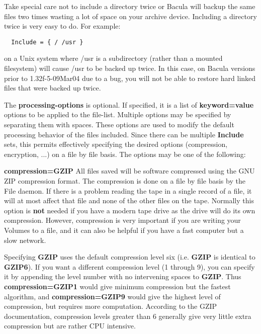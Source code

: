 \begin{description}
Take special care not to include a directory twice or Bacula will backup the
same files two times wasting a lot of space on your archive device. Including
a directory twice is very easy to do. For example: 

\footnotesize
\begin{verbatim}
  Include = { / /usr }
\end{verbatim}
\normalsize

on a Unix system where /usr is a subdirectory (rather than a mounted
filesystem) will cause /usr to be backed up twice. In this case, on Bacula
versions prior to 1.32f-5-09Mar04 due to a bug, you will not be able to
restore hard linked files that were backed up twice. 

The {\bf \lt{}processing-options\gt{}} is optional. If specified, it is a list
of {\bf keyword=value} options to be applied to the file-list. Multiple
options may be specified by separating them with spaces. These options are
used to modify the default processing behavior of the files included. Since
there can be multiple {\bf Include} sets, this permits effectively specifying
the desired options (compression, encryption, ...) on a file by file basis.
The options may be one of the following: 

\begin{description}

\item {\bf compression=GZIP}
All files saved will be software  compressed using the GNU ZIP compression
format. The  compression is done on a file by file basis by the File daemon. 
If there is a problem reading the tape in a  single record of a file, it will
at most affect that file and none  of the other files on the tape. Normally
this option is {\bf not} needed  if you have a modern tape drive as the drive
will do its own  compression. However, compression is very important if you
are writing  your Volumes to a file, and it can also be helpful if you have a 
fast computer but a slow network.  

Specifying {\bf GZIP} uses the default compression level six  (i.e. {\bf GZIP}
is identical to {\bf GZIP6}). If you  want a different compression level (1
through 9), you can specify  it by appending the level number with no
intervening spaces  to {\bf GZIP}. Thus {\bf compression=GZIP1} would give
minimum  compression but the fastest algorithm, and {\bf compression=GZIP9} 
would give the highest level of compression, but requires more  computation.
According to the GZIP documentation, compression levels  greater than 6
generally give very little extra compression but are  rather CPU intensive. 


\end{description}
\end{description}
